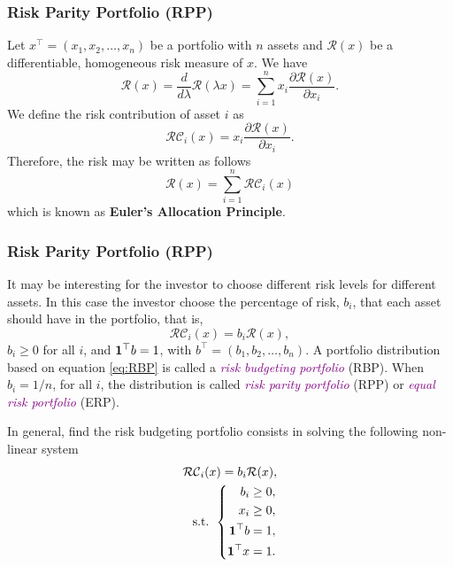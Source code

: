 \begin{frame}[t]\frametitle{Risk Parity Portfolio (RPP)}\bigskip
	Let $x^\top=(x_1,x_2,\dots,x_n)$ be a portfolio with $n$ assets and $\mathcal{R}(x)$ be a differentiable, homogeneous risk measure of $x$. We have
	\begin{equation}
		\mathcal{R}(x)=\frac{d}{d\lambda}\mathcal{R}(\lambda x)=\sum_{i=1}^n x_i \frac{\partial \mathcal{R} (x)}{\partial x_i}.
	\end{equation}
	We define the risk contribution of asset $i$  as
	\begin{equation}
		\mathcal{RC}_i(x)= x_i \frac{\partial \mathcal{R}(x)}{\partial x_i}.
	\end{equation}
	Therefore, the risk may be written as follows
	\begin{equation}
		\mathcal{R}(x)=\sum_{i=1}^n \mathcal{RC}_i(x)
	\end{equation}
	which is known as \textbf{Euler's Allocation Principle}.

\end{frame}

\begin{frame}[t]\frametitle{Risk Parity Portfolio (RPP)}\bigskip
	It may be interesting for the investor to choose different risk levels for different assets. In this case the investor choose the percentage of risk, $b_i$, that each asset should have in the portfolio, that is,
	\begin{equation}\label{eq:RBP}
		\mathcal{RC}_i(x)=b_i\mathcal{R}(x),
	\end{equation}
	$b_i\geq 0$ for all $i$, and
	${\bf 1}^\top b =1$, with $b^\top=(b_1, b_2, \dots, b_n)$. A portfolio distribution based on equation \eqref{eq:RBP} is called a \textcolor{purple}{\textit{risk budgeting portfolio}} (RBP). When $b_i=1/n$, for all $i$, the distribution is called \textcolor{purple}{\textit{risk parity portfolio}} (RPP) or \textcolor{purple}{\textit{equal risk portfolio}} (ERP).

	In general, find the risk budgeting portfolio consists in solving the following non-linear system
	\begin{eqnarray}
		\mathcal{RC}_i(x)=b_i\mathcal{R}(x), \nonumber\\
		\mbox{s.t. }\left\{
		\begin{aligned}
			b_i \geq 0,        \\
			x_i \geq 0,        \\
			{\bf 1}^\top b =1, \\
			{\bf 1}^\top x =1.
		\end{aligned}
		\right.
	\end{eqnarray}
\end{frame}

